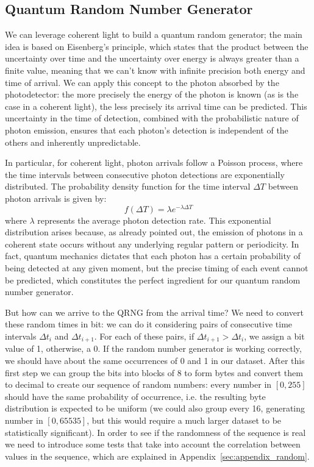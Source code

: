 \documentclass[prl,twocolumn]{revtex4-1}
\begin{document}
\subsection{Quantum Random Number Generator}
\label{sec:qrng_theory}
We can leverage coherent light to build a quantum random generator; the main idea is based on Eisenberg's principle, which states that the product between the uncertainty over time and the uncertainty over energy is always greater than a finite value, meaning that we can't know with infinite precision both energy and time of arrival. We can apply this concept to the photon absorbed by the photodetector: the more precisely the energy of the photon is known (as is the case in a coherent light), the less precisely its arrival time can be predicted. This uncertainty in the time of detection, combined with the probabilistic nature of photon emission, ensures that each photon’s detection is independent of the others and inherently unpredictable.

In particular, for coherent light, photon arrivals follow a Poisson process, where the time intervals between consecutive photon detections are exponentially distributed. The probability density function for the time interval $\Delta T$ between photon arrivals is given by:
%
\begin{equation}
    \label{eq:geometric_distribution}
    f(\Delta T) = \lambda e^{-\lambda \Delta T}
\end{equation}
%
where $\lambda$ represents the average photon detection rate. This exponential distribution arises because, as already pointed out, the emission of photons in a coherent state occurs without any underlying regular pattern or periodicity. In fact, quantum mechanics dictates that each photon has a certain probability of being detected at any given moment, but the precise timing of each event cannot be predicted, which constitutes the perfect ingredient for our quantum random number generator.

But how can we arrive to the QRNG from the arrival time? We need to convert these random times in bit: we can do it considering pairs of consecutive time intervals $\Delta t_i$ and $\Delta t_{i+1}$. For each of these pairs, if $\Delta t_{i+1} > \Delta t_i$, we assign a bit value of 1, otherwise, a 0. If the random number generator is working correctly, we should have about the same occurrences of 0 and 1 in our dataset. After this first step we can group the bits into blocks of 8 to form bytes and convert them to decimal to create our sequence of random numbers: every number in $[0, 255]$ should have the same probability of occurrence, i.e. the resulting byte distribution is expected to be uniform (we could also group every 16, generating number in $[0, 65535]$, but this would require a much larger dataset to be statistically significant). In order to see if the randomness of the sequence is real we need to introduce some tests that take into account the correlation between values in the sequence, which are explained in Appendix~\ref{sec:appendix_random}.
\end{document}
